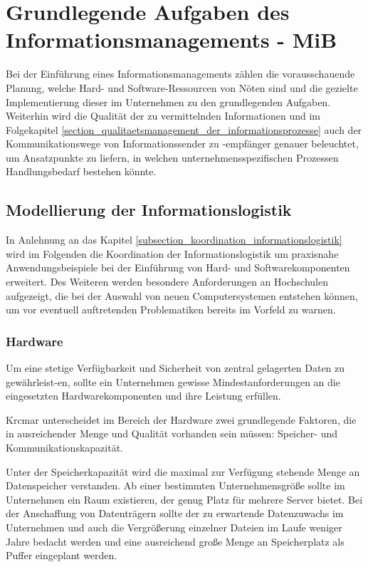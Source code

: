 \section{Grundlegende Aufgaben des Informationsmanagements - MiB}
\label{grundlegende_aufgaben_des_informationsmanagements}
Bei der Einführung eines Informationsmanagements zählen die vorausschauende 
Planung, welche Hard- und Software-Ressourcen von Nöten sind und die gezielte 
Implementierung dieser im Unternehmen zu den grundlegenden Aufgaben. 
Weiterhin wird die Qualität der zu vermittelnden Informationen und im Folgekapitel 
\ref{section_qualitaetsmanagement_der_informationsprozesse} auch der Kommunikationswege von Informationssender zu -empfänger genauer beleuchtet, 
um Ansatzpunkte zu liefern, in welchen unternehmensspezifischen Prozessen 
Handlungsbedarf bestehen könnte.

\subsection{Modellierung der Informationslogistik}
In Anlehnung an das Kapitel \ref{subsection_koordination_informationslogistik} wird im Folgenden die Koordination der Informationslogistik um praxisnahe Anwendungsbeispiele bei der Einführung von 
Hard- und Softwarekomponenten erweitert. Des Weiteren werden besondere Anforderungen an 
Hochschulen aufgezeigt, die bei der Auswahl von neuen Computersystemen entstehen können, 
um vor eventuell auftretenden Problematiken bereits im Vorfeld zu warnen.

\subsubsection{Hardware}
Um eine stetige Verfügbarkeit und Sicherheit von zentral gelagerten Daten zu gewährleist-en, 
sollte ein Unternehmen gewisse Mindestanforderungen an die eingesetzten Hardwarekomponenten 
und ihre Leistung erfüllen. 

Krcmar unterscheidet im Bereich der Hardware zwei grundlegende Faktoren, die in ausreichender 
Menge und Qualität vorhanden sein müssen: Speicher- und Kommunikationskapazität. 

Unter der Speicherkapazität wird die maximal zur Verfügung stehende Menge an Datenspeicher verstanden. 
Ab einer bestimmten Unternehmensgröße sollte im Unternehmen ein Raum existieren, der genug Platz 
für mehrere Server bietet. Bei der Anschaffung von Datenträgern sollte der zu erwartende 
Datenzuwachs im Unternehmen und auch die Vergrößerung einzelner Dateien im Laufe weniger Jahre 
bedacht werden und eine ausreichend große Menge an Speicherplatz als Puffer eingeplant werden. 

